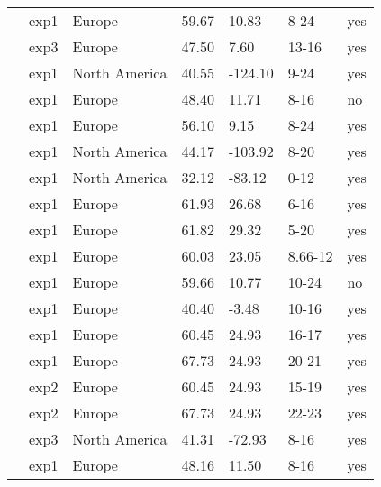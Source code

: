 \documentclass{article}
\begin{document}
\begin{footnotesize}
\begin{table}[ht]
\begin{tabular}{|p{}|p{}|p{}|p{}|p{}|p{}|p{}|}
  \citet{Heide:1993a} & exp1 & Europe & 59.67 & 10.83 & 8-24 & yes \\ 
  \citet{Heide:1993a} & exp3 & Europe & 47.50 & 7.60 & 13-16 & yes \\ 
  \citet{Howe:1995aa} & exp1 & North America & 40.55 & -124.10 & 9-24 & yes \\ 
  \citet{Laube:2014a} & exp1 & Europe & 48.40 & 11.71 & 8-16 & no \\ 
  \citet{Myking:1995} & exp1 & Europe & 56.10 & 9.15 & 8-24 & yes \\ 
  \citet{Nienstaedt:1966aa} & exp1 & North America & 44.17 & -103.92 & 8-20 & yes \\ 
  \citet{Okie:2011aa} & exp1 & North America & 32.12 & -83.12 & 0-12 & yes \\ 
  \citet{Partanen:2001aa} & exp1 & Europe & 61.93 & 26.68 & 6-16 & yes \\ 
  \citet{Partanen:2005aa} & exp1 & Europe & 61.82 & 29.32 & 5-20 & yes \\ 
  \citet{Partanen:1998aa} & exp1 & Europe & 60.03 & 23.05 & 8.66-12 & yes \\ 
  \citet{Pettersen:1972aa} & exp1 & Europe & 59.66 & 10.77 & 10-24 & no \\ 
  \citet{Sanz-Perez:2009aa} & exp1 & Europe & 40.40 & -3.48 & 10-16 & yes \\ 
  \citet{Vihera-Aarnio:2006aa} & exp1 & Europe & 60.45 & 24.93 & 16-17 & yes \\ 
  \citet{Vihera-Aarnio:2006aa} & exp1 & Europe & 67.73 & 24.93 & 20-21 & yes \\ 
  \citet{Vihera-Aarnio:2006aa} & exp2 & Europe & 60.45 & 24.93 & 15-19 & yes \\ 
  \citet{Vihera-Aarnio:2006aa} & exp2 & Europe & 67.73 & 24.93 & 22-23 & yes \\ 
  \citet{Worrall:1967aa} & exp3 & North America & 41.31 & -72.93 & 8-16 & yes \\ 
  \citet{zohner2016} & exp1 & Europe & 48.16 & 11.50 & 8-16 & yes \\ 
   \hline
\end{tabular}
\endgroup
\end{table}\end{footnotesize} 

 
\end{document}
